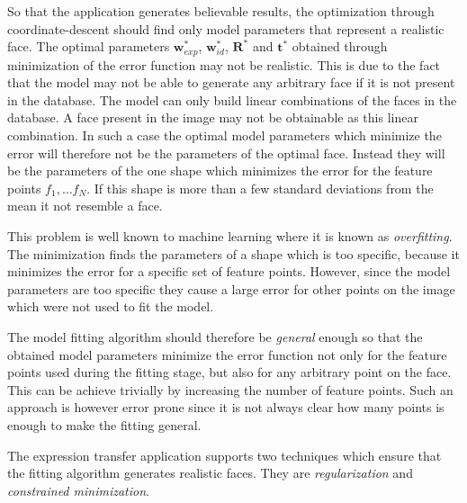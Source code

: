 \documentclass[11pt,a4paper]{report}
\begin{document}
So that the application generates believable results, the optimization through coordinate-descent
should find only model parameters that represent a realistic face. The optimal
parameters $\mathbf{w}^*_{exp}$, $\mathbf{w}^*_{id}$, $\mathbf{R}^*$ and
$\mathbf{t}^*$ obtained through minimization of the error function may not be realistic. This is due to the fact that the model may not
be able to generate any arbitrary face if it is not present in the database. The model
can only build linear combinations of the faces in the database. A face present
in the image may not be obtainable as this linear combination. In such a case the
optimal model parameters which minimize the error will therefore not be the parameters
of the optimal face. Instead they will be the parameters of the one shape which
minimizes the error for the feature points $f_1, \ldots f_N$. If this shape is
more than a few standard deviations from the mean it not resemble a face. 

This problem is well known to machine learning
where it is known as \textit{overfitting}. The minimization finds the parameters
of a shape which is too specific, because it minimizes the error for a specific set of
feature points. However, since the model parameters are too specific they cause
a large error for other points on the image which were not used to fit the
model. 

The model fitting algorithm should therefore be \textit{general} enough so that
the obtained model parameters minimize the error function not only for the feature points used during the fitting stage, but also for any
arbitrary point on the face. This can be achieve trivially by increasing the
number of feature points. Such an approach is however error prone since it is not
always clear how many points is enough to make the fitting general. 

The expression transfer application supports two techniques which ensure that the
fitting algorithm generates realistic faces. They are \textit{regularization}
and \textit{constrained minimization}.
\end{document}
